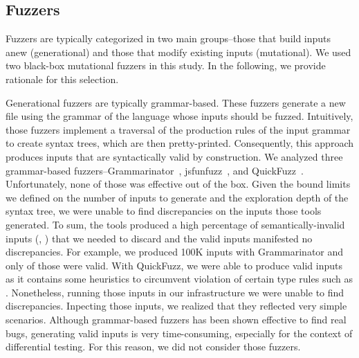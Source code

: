 \documentclass[10pt,conference,anonymous]{IEEEtran}
\begin{document}

\subsection{Fuzzers}
\label{sec:objects:fuzzers}


Fuzzers are typically categorized in two main groups--those that build
inputs anew (generational) and those that modify existing inputs
(mutational). We used two black-box mutational
fuzzers
in this study. In the following, we provide rationale for this
selection.

Generational fuzzers are typically grammar-based. These fuzzers
generate a new file using the grammar of the language whose inputs
should be fuzzed. Intuitively, those fuzzers implement a traversal of
the production rules of the input grammar to create syntax trees,
which are then pretty-printed. Consequently, this approach produces
inputs that are syntactically valid by construction.  We analyzed
three grammar-based fuzzers--Grammarinator~\cite{grammarinator},
jsfunfuzz~\cite{jsfunfuzz}, and
QuickFuzz~\cite{quickfuzz,grieco2016quickfuzz}.  Unfortunately, none
of those was effective out of the box. Given the bound limits we
defined on the number of inputs to generate and the exploration depth
of the syntax tree, we were unable to find discrepancies on the inputs
those tools generated. To sum, the tools produced a high percentage of
semantically-invalid inputs (\eg{}, ) that we needed to
discard and the valid inputs manifested no discrepancies. For example,
we produced 100K inputs with Grammarinator and only  of those
were valid. With QuickFuzz, we were able to produce 
valid inputs as it contains some heuristics to circumvent violation of
certain type rules such as . Nonetheless, running those inputs in our infrastructure
we were unable to find discrepancies. Inpecting those inputs, we
realized that they reflected very simple scenarios. Although grammar-based fuzzers has been shown effective to
find real bugs, generating
valid inputs is very time-consuming, especially for the context of
differential testing. For this reason, we did not consider those fuzzers.
\end{document}
